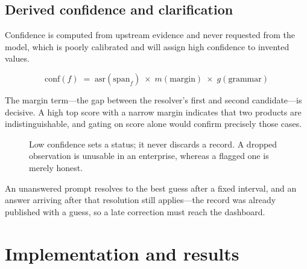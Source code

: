 \documentclass[11pt,a4paper]{article}
\begin{document}
\subsection{Derived confidence and clarification}

Confidence is computed from upstream evidence and never requested from the
model, which is poorly calibrated and will assign high confidence to invented
values.

\[
  \text{conf}(f) \;=\; \text{asr}(\text{span}_f) \;\times\; m(\text{margin}) \;\times\; g(\text{grammar})
\]

The margin term---the gap between the resolver's first and second
candidate---is decisive. A high top score with a narrow margin indicates that
two products are indistinguishable, and gating on score alone would confirm
precisely those cases.

\begin{figure}[h]
\centering
{}
\caption{Low confidence sets a status; it never discards a record. A dropped observation is unusable in an enterprise, whereas a flagged one is merely honest.}
\end{figure}

An unanswered prompt resolves to the best guess after a fixed interval, and an
answer arriving after that resolution still applies---the record was already
published with a guess, so a late correction must reach the dashboard.

\section{Implementation and results}
\end{document}
